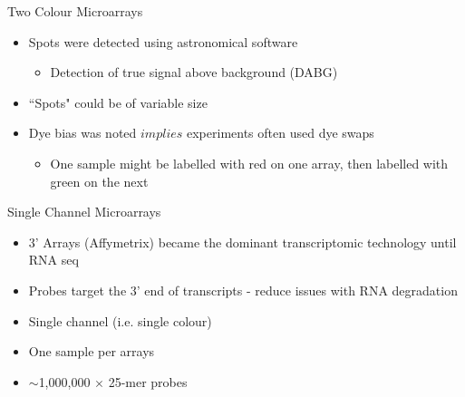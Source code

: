 \documentclass[aspectratio=169,11pt]{beamer}
\begin{document}
\begin{frame}{Two Colour Microarrays}

	\begin{itemize}
		\item Spots were detected using astronomical software
		\begin{itemize}
			\item Detection of true signal above background (DABG)
		\end{itemize}
		\item ``Spots" could be of variable size
		\item Dye bias was noted $implies$ experiments often used dye swaps
		\begin{itemize}
			\item One sample might be labelled with red on one array, then labelled with green on the next
		\end{itemize}
	\end{itemize}

\end{frame}

\begin{frame}{Single Channel Microarrays}

	\begin{itemize}
		\item 3’ Arrays (Affymetrix) became the dominant transcriptomic technology until RNA seq
		\item Probes target the 3’ end of transcripts - reduce issues with RNA degradation
		\item Single channel (i.e. single colour)
		\item One sample per arrays
		\item $\sim$1,000,000 $\times$ 25-mer probes
	\end{itemize}

\end{frame}
\end{document}
